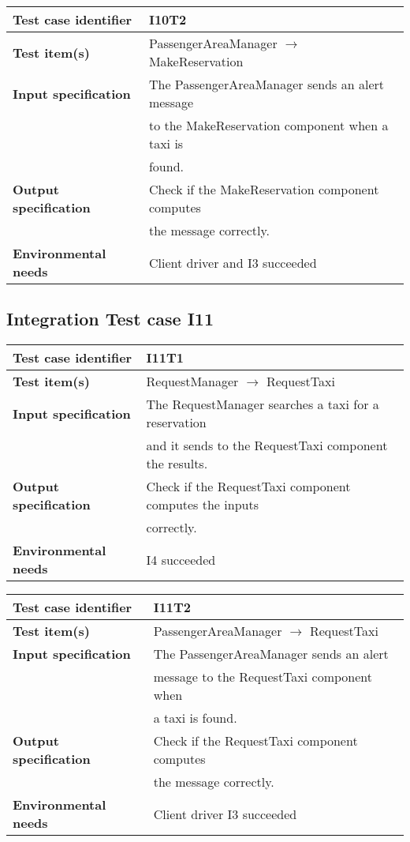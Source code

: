		\vspace{1cm}
		
		\begin{tabular}{ l l}
			\hline 		\textbf{Test case identifier} & I10T2 \\
			\hline		\textbf{Test item(s)}  & PassengerAreaManager $\rightarrow$ MakeReservation \\
			\hline		\textbf{Input specification} & The PassengerAreaManager sends an alert message\\ & to the MakeReservation component when a taxi is \\ & found.\\
			\hline		\textbf{Output specification} &  Check if the MakeReservation component computes \\ & the message correctly.\\
			\hline		\textbf{Environmental needs} & Client driver and I3 succeeded\\
			\hline
			\end{tabular}
	\subsection{Integration Test case I11}
		\begin{tabular}{ l l}
			\hline 		\textbf{Test case identifier} & I11T1 \\
			\hline		\textbf{Test item(s)}  & RequestManager $\rightarrow$ RequestTaxi \\
			\hline		\textbf{Input specification} & The RequestManager searches a taxi for a reservation\\ & and it sends to the RequestTaxi component the results.\\
			\hline		\textbf{Output specification} & Check if the RequestTaxi component computes the inputs\\ & correctly.\\
			\hline		\textbf{Environmental needs} & I4 succeeded\\
			\hline
		\end{tabular}
		
		\vspace{1cm}
		
		\begin{tabular}{ l l}
			\hline 		\textbf{Test case identifier} & I11T2 \\
			\hline		\textbf{Test item(s)}  & PassengerAreaManager $\rightarrow$ RequestTaxi \\
			\hline		\textbf{Input specification} & The PassengerAreaManager sends an alert \\ & message to the RequestTaxi component when\\ & a taxi is found.\\
			\hline		\textbf{Output specification} & Check if the RequestTaxi component computes\\ & the  message correctly.\\
			\hline		\textbf{Environmental needs} & Client driver I3 succeeded\\
			\hline
		\end{tabular}
